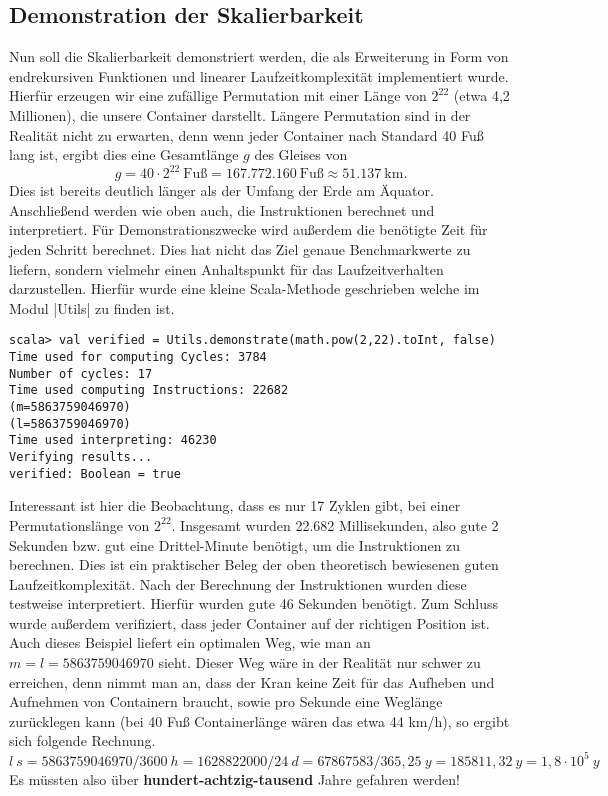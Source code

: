 \subsection{Demonstration der Skalierbarkeit}
\label{scalability}
Nun soll die Skalierbarkeit demonstriert werden,
die als Erweiterung in Form von endrekursiven Funktionen und linearer Laufzeitkomplexität implementiert wurde.\\
Hierfür erzeugen wir eine zufällige Permutation mit einer Länge von $2^{22}$ (etwa 4,2 Millionen), die unsere Container darstellt.
Längere Permutation sind in der Realität nicht zu erwarten, denn wenn jeder Container nach Standard 40 Fuß lang ist, ergibt dies eine Gesamtlänge $g$ des Gleises von
 \[ g = 40 \cdot 2^{22}\ \text{Fuß} = 167.772.160\ \text{Fuß} \approx 51.137\ \text{km}. \]
Dies ist bereits deutlich länger als der Umfang der Erde am Äquator.
Anschließend werden wie oben auch, die Instruktionen berechnet und interpretiert.
Für Demonstrationszwecke wird außerdem die benötigte Zeit für jeden Schritt berechnet.
Dies hat nicht das Ziel genaue Benchmarkwerte zu liefern, sondern vielmehr einen Anhaltspunkt für das Laufzeitverhalten darzustellen.
Hierfür wurde eine kleine Scala-Methode geschrieben welche im Modul |Utils| zu finden ist.
\begin{lstlisting}
scala> val verified = Utils.demonstrate(math.pow(2,22).toInt, false)
Time used for computing Cycles: 3784
Number of cycles: 17
Time used computing Instructions: 22682
(m=5863759046970)
(l=5863759046970)
Time used interpreting: 46230
Verifying results...
verified: Boolean = true
\end{lstlisting}
\lstset{basicstyle=\ttfamily}
Interessant ist hier die Beobachtung, dass es nur 17 Zyklen gibt, bei einer Permutationslänge von $2^{22}$.
Insgesamt wurden 22.682 Millisekunden, also gute 2 Sekunden bzw. gut eine Drittel-Minute benötigt, um die Instruktionen zu berechnen.
Dies ist ein praktischer Beleg der oben theoretisch bewiesenen guten Laufzeitkomplexität.
Nach der Berechnung der Instruktionen wurden diese testweise interpretiert. Hierfür wurden gute 46 Sekunden benötigt.
Zum Schluss wurde außerdem verifiziert, dass jeder Container auf der richtigen Position ist.
Auch dieses Beispiel liefert ein optimalen Weg, wie man an $m = l = 5863759046970$ sieht.
Dieser Weg wäre in der Realität nur schwer zu erreichen, denn nimmt man an, dass der Kran keine Zeit für das Aufheben und Aufnehmen von Containern braucht,
 sowie pro Sekunde eine Weglänge zurücklegen kann (bei 40 Fuß Containerlänge wären das etwa 44 km/h), so ergibt sich folgende Rechnung.
\[l\ s = 5863759046970 / 3600\ h = 1628822000 / 24\ d = 67867583 / 365,25\ y = 185811,32\ y = 1,8 \cdot 10^{5}\ y \]
Es müssten also über \textbf{hundert-achtzig-tausend} Jahre gefahren werden!
\clearpage

